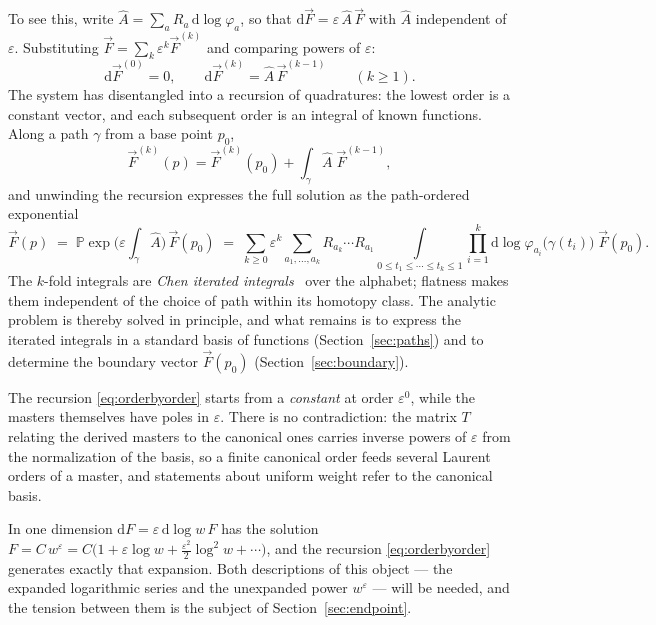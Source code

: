 \documentclass[11pt]{article}
\newcommand{\eps}{\varepsilon}
\newcommand{\dd}{\mathrm{d}}
\newcommand{\Pexp}{\mathbb{P}\exp}
\begin{document}
To see this, write $\hat A = \sum_a R_a\,\dd\log\varphi_a$, so that
$\dd\vec F = \eps\,\hat A\,\vec F$ with $\hat A$ independent of
$\eps$.  Substituting $\vec F = \sum_{k}\eps^k \vec F^{(k)}$ and
comparing powers of $\eps$:
\begin{equation}
  \dd \vec F^{(0)} = 0,
  \qquad
  \dd \vec F^{(k)} = \hat A\, \vec F^{(k-1)} \qquad (k \ge 1) .
  \label{eq:orderbyorder}
\end{equation}
The system has disentangled into a recursion of quadratures: the
lowest order is a constant vector, and each subsequent order is an
integral of known functions.  Along a path $\gamma$ from a base
point $p_0$,
\begin{equation}
  \vec F^{(k)}(p) = \vec F^{(k)}(p_0)
  + \int_\gamma \hat A\;\vec F^{(k-1)} ,
\end{equation}
and unwinding the recursion expresses the full solution as the
path-ordered exponential
\begin{equation}
  \vec F(p) \;=\; \Pexp\!\Big(\eps \int_{\gamma} \hat A\Big)\,
  \vec F(p_0)
  \;=\; \sum_{k\ge0} \eps^k \!\!
  \sum_{a_1,\dots,a_k}\!\!
  R_{a_k}\!\cdots R_{a_1}
  \int\limits_{0\le t_1\le\cdots\le t_k\le 1}
  \prod_{i=1}^{k}\dd\log \varphi_{a_i}\big(\gamma(t_i)\big)\;
  \vec F(p_0) .
  \label{eq:pexp}
\end{equation}
The $k$-fold integrals are \emph{Chen iterated
integrals}~\cite{chen} over the alphabet; flatness makes them
independent of the choice of path within its homotopy class.  The analytic problem is thereby solved
in principle, and what remains is to express the iterated integrals
in a standard basis of functions (Section~\ref{sec:paths}) and to
determine the boundary vector $\vec F(p_0)$
(Section~\ref{sec:boundary}).

The recursion \eqref{eq:orderbyorder} starts from a \emph{constant}
at order $\eps^0$, while the masters themselves have poles in $\eps$.
There is no contradiction: the matrix $T$ relating the derived
masters to the canonical ones carries inverse powers of $\eps$ from
the normalization of the basis, so a finite canonical order feeds
several Laurent orders of a master, and statements about uniform
weight refer to the canonical basis.

In one dimension $\dd F = \eps\,\dd\log w\,F$ has the solution
$F = C\,w^{\eps} = C\big(1 + \eps\log w + \tfrac{\eps^2}{2}\log^2 w
+ \cdots\big)$, and the recursion \eqref{eq:orderbyorder} generates
exactly that expansion.  Both descriptions of this object --- the
expanded logarithmic series and the unexpanded power $w^\eps$ ---
will be needed, and the tension between them is the subject of
Section~\ref{sec:endpoint}.
\end{document}

